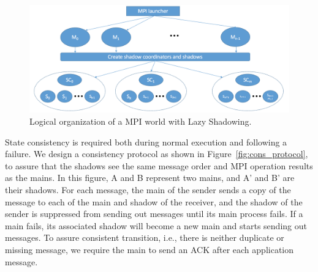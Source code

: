 \begin{figure}[!t]
  \begin{center}
      \includegraphics[width=\columnwidth]{figures/logical_org}
  \end{center}
  \caption{Logical organization of a MPI world with Lazy Shadowing.}
  \label{fig:logical_org}
\end{figure}

State consistency is required both during normal execution and following a failure. %
We design a consistency protocol as shown in Figure~\ref{fig:cons_protocol}, 
to assure 
that the shadows see the same message order and MPI operation results as the mains. In this figure, A and B represent two mains, and A' and B' are their shadows. 
For each message, the main of the sender sends a copy of the message to each of the main and shadow of the receiver, and the shadow of the sender is suppressed from sending out messages until its main process fails. %
If a main fails,
its associated shadow will become a new main and starts sending out messages.
To assure consistent transition, i.e., there is neither duplicate or missing message, we require the main to send an ACK after each application message. %


